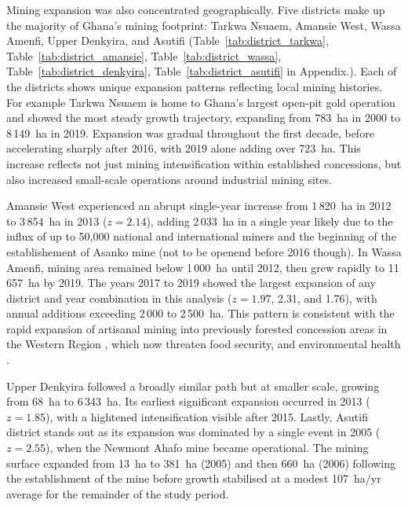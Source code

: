 \documentclass[]{interact}
\begin{document}
Mining expansion was also concentrated geographically. Five districts make up the majority of Ghana's mining footprint: Tarkwa Nsuaem, Amansie West, Wassa Amenfi, Upper Denkyira, and Asutifi (Table~\ref{tab:district_tarkwa}, Table~\ref{tab:district_amansie}, Table~\ref{tab:district_wassa}, Table~\ref{tab:district_denkyira}, Table~\ref{tab:district_asutifi} in Appendix.). Each of the districts shows unique expansion patterns reflecting local mining histories. For example Tarkwa Nsuaem is home to Ghana's largest open-pit gold operation and showed the most steady growth trajectory, expanding from 783~ha in 2000 to 8\,149~ha in 2019. Expansion was gradual throughout the first decade, before accelerating sharply after 2016, with 2019 alone adding over 723~ha. This increase reflects not just mining intensification within established concessions, but also increased small-scale operations around industrial mining sites.

Amansie West experienced an abrupt single-year increase from 1\,820~ha in 2012 to 3\,854~ha in 2013 ($z = 2.14$), adding 2\,033~ha in a single year likely due to the influx of up to 50,000 national and international miners \citep{aikins2024Ghana,asiedu2023Assessing} and the beginning of the establishement of Asanko mine (not to be openend before 2016 though). In Wassa Amenfi, mining area remained below 1\,000~ha until 2012, then grew rapidly to 11\,657~ha by 2019. The years 2017 to 2019 showed the largest expansion of any district and year combination in this analysis ($z = 1.97$, 2.31, and 1.76), with annual additions exceeding 2\,000 to 2\,500~ha. This pattern is consistent with the rapid expansion of artisanal mining into previously forested concession areas in the Western Region \citep{asiedu2023Assessing,asori2022illegal}, which now threaten food security, and environmental health \citep{barenblitt2021large,mensah2015Environmental,mensah2025Subaltern}.

Upper Denkyira followed a broadly similar path but at smaller scale, growing from 68~ha to 6\,343~ha. Its earliest significant expansion occurred in 2013 ($z = 1.85$), with a hightened intensification visible after 2015. Lastly, Asutifi district stands out as its expansion was dominated by a single event in 2005 ($z = 2.55$), when the Newmont Ahafo mine became operational. The mining surface expanded from 13~ha to 381~ha (2005) and then 660~ha (2006) following the establishment of the mine before growth stabilised at a modest 107~ha/yr average for the remainder of the study period.
\end{document}
